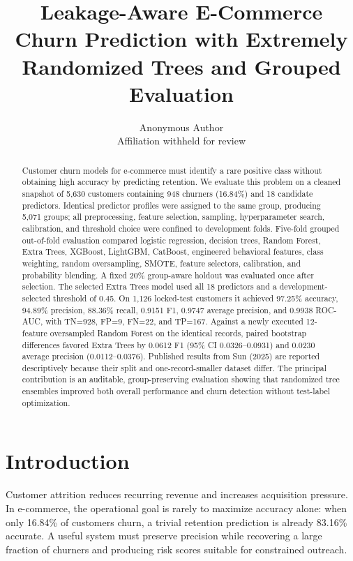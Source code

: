 \documentclass[11pt]{article}
\title{Leakage-Aware E-Commerce Churn Prediction with Extremely Randomized Trees and Grouped Evaluation}
\author{Anonymous Author\\Affiliation withheld for review}
\date{}
\begin{document}
\maketitle
\begin{abstract}
Customer churn models for e-commerce must identify a rare positive class without obtaining high accuracy by predicting retention. We evaluate this problem on a cleaned snapshot of 5,630 customers containing 948 churners (16.84\%) and 18 candidate predictors. Identical predictor profiles were assigned to the same group, producing 5,071 groups; all preprocessing, feature selection, sampling, hyperparameter search, calibration, and threshold choice were confined to development folds. Five-fold grouped out-of-fold evaluation compared logistic regression, decision trees, Random Forest, Extra Trees, XGBoost, LightGBM, CatBoost, engineered behavioral features, class weighting, random oversampling, SMOTE, feature selectors, calibration, and probability blending. A fixed 20\% group-aware holdout was evaluated once after selection. The selected Extra Trees model used all 18 predictors and a development-selected threshold of 0.45. On 1,126 locked-test customers it achieved 97.25\% accuracy, 94.89\% precision, 88.36\% recall, 0.9151 F1, 0.9747 average precision, and 0.9938 ROC-AUC, with TN=928, FP=9, FN=22, and TP=167. Against a newly executed 12-feature oversampled Random Forest on the identical records, paired bootstrap differences favored Extra Trees by 0.0612 F1 (95\% CI 0.0326--0.0931) and 0.0230 average precision (0.0112--0.0376). Published results from Sun (2025) are reported descriptively because their split and one-record-smaller dataset differ. The principal contribution is an auditable, group-preserving evaluation showing that randomized tree ensembles improved both overall performance and churn detection without test-label optimization.
\end{abstract}

\section{Introduction}
Customer attrition reduces recurring revenue and increases acquisition pressure. In e-commerce, the operational goal is rarely to maximize accuracy alone: when only 16.84\% of customers churn, a trivial retention prediction is already 83.16\% accurate. A useful system must preserve precision while recovering a large fraction of churners and producing risk scores suitable for constrained outreach.
\end{document}
